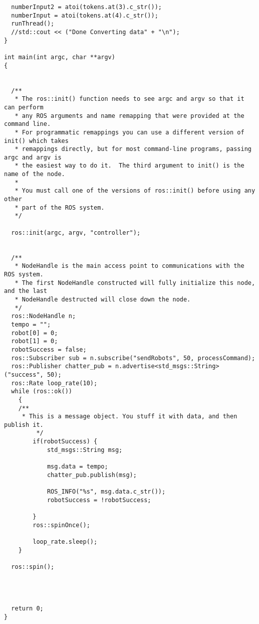 \begin{lstlisting}
  numberInput2 = atoi(tokens.at(3).c_str());
  numberInput = atoi(tokens.at(4).c_str());
  runThread();
  //std::cout << ("Done Converting data" + "\n");
}

int main(int argc, char **argv)
{

    
  /**
   * The ros::init() function needs to see argc and argv so that it can perform
   * any ROS arguments and name remapping that were provided at the command line.
   * For programmatic remappings you can use a different version of init() which takes
   * remappings directly, but for most command-line programs, passing argc and argv is
   * the easiest way to do it.  The third argument to init() is the name of the node.
   *
   * You must call one of the versions of ros::init() before using any other
   * part of the ROS system.
   */
  
  ros::init(argc, argv, "controller");
  
  
  /**
   * NodeHandle is the main access point to communications with the ROS system.
   * The first NodeHandle constructed will fully initialize this node, and the last
   * NodeHandle destructed will close down the node.
   */
  ros::NodeHandle n;
  tempo = "";
  robot[0] = 0;
  robot[1] = 0;
  robotSuccess = false;
  ros::Subscriber sub = n.subscribe("sendRobots", 50, processCommand);
  ros::Publisher chatter_pub = n.advertise<std_msgs::String>("success", 50);
  ros::Rate loop_rate(10);
  while (ros::ok())
    {
    /**
     * This is a message object. You stuff it with data, and then publish it.
         */
        if(robotSuccess) {
            std_msgs::String msg;
            
            msg.data = tempo;
            chatter_pub.publish(msg);

            ROS_INFO("%s", msg.data.c_str());
            robotSuccess = !robotSuccess;
            
        }
        ros::spinOnce();

        loop_rate.sleep();
    }

  ros::spin();
  
  


  return 0;
}
\end{lstlisting}
